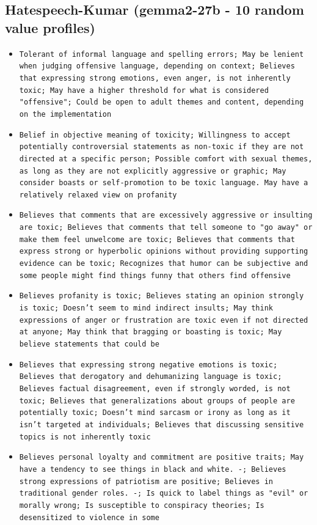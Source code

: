 \documentclass[11pt]{article}
\begin{document}
\subsection{Hatespeech-Kumar (gemma2-27b - 10 random value profiles)}
\begin{itemize}
\item \texttt{Tolerant of informal language and spelling errors; May be lenient when judging offensive language, depending on context; Believes that expressing strong emotions, even anger, is not inherently toxic; May have a higher threshold for what is considered "offensive"; Could be open to adult themes and content, depending on the implementation}
\item \texttt{Belief in objective meaning of toxicity; Willingness to accept potentially controversial statements as non-toxic if they are not directed at a specific person; Possible comfort with sexual themes, as long as they are not explicitly aggressive or graphic; May consider boasts or self-promotion to be toxic language. May have a relatively relaxed view on profanity}
\item \texttt{Believes that comments that are excessively aggressive or insulting are toxic; Believes that comments that tell someone to "go away" or make them feel unwelcome are toxic; Believes that comments that express strong or hyperbolic opinions without providing supporting evidence can be toxic; Recognizes that humor can be subjective and some people might find things funny that others find offensive}
\item \texttt{Believes profanity is toxic; Believes stating an opinion strongly is toxic; Doesn't seem to mind indirect insults; May think expressions of anger or frustration are toxic even if not directed at anyone; May think that bragging or boasting is toxic; May believe statements that could be}
\item \texttt{Believes that expressing strong negative emotions is toxic; Believes that derogatory and dehumanizing language is toxic; Believes factual disagreement, even if strongly worded, is not toxic; Believes that generalizations about groups of people are potentially toxic; Doesn't mind sarcasm or irony as long as it isn’t targeted at individuals; Believes that discussing sensitive topics is not inherently toxic}
\item \texttt{Believes personal loyalty and commitment are positive traits; May have a tendency to see things in black and white. -; Believes strong expressions of patriotism are positive; Believes in traditional gender roles. -; Is quick to label things as "evil" or morally wrong; Is susceptible to conspiracy theories; Is desensitized to violence in some}

\end{itemize}
\end{document}
